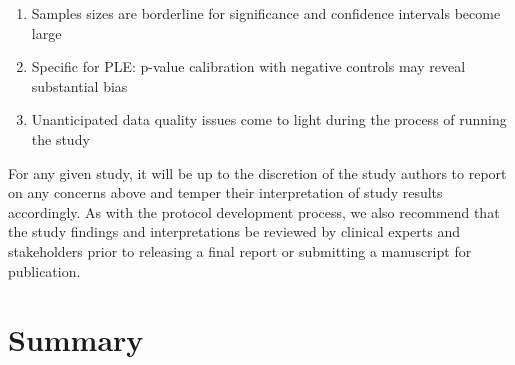 \documentclass[11pt]{book}
\providecommand{\tightlist}{%
  \setlength{\itemsep}{0pt}\setlength{\parskip}{0pt}}
\theoremstyle{definition}
\theoremstyle{definition}
\theoremstyle{definition}
\theoremstyle{remark}
\begin{document}
\begin{enumerate}
\def\labelenumi{\arabic{enumi}.}
\tightlist
\item
  Samples sizes are borderline for significance and confidence intervals become large
\item
  Specific for PLE: p-value calibration with negative controls may reveal substantial bias
\item
  Unanticipated data quality issues come to light during the process of running the study
\end{enumerate}

For any given study, it will be up to the discretion of the study authors to report on any concerns above and temper their interpretation of study results accordingly.
As with the protocol development process, we also recommend that the study findings and interpretations be reviewed by clinical experts and stakeholders prior to releasing a final report or submitting a manuscript for publication.

\hypertarget{summary-13}{%
\section{Summary}\label{summary-13}}
\end{document}
